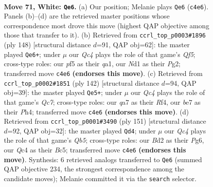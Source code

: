 \documentclass[11pt]{article}
\begin{document}
\clearpage

\begin{figure}[p]\centering
\begin{subfigure}{0.46\textwidth}\centering
\resizebox{\linewidth}{!}{%
\newchessgame
\chessboard[
  setfen={5r2/q3b1k1/5n2/P1p2p2/2Qp1Pp1/8/1R1BPK2/3N4 w - - 2 71},
  showmover=false,
  pgfstyle=straightmove, color=movearrow, markmove={c4-e6}
]}
\caption{}
\end{subfigure}\hfill
\begin{subfigure}{0.46\textwidth}\centering
\resizebox{\linewidth}{!}{%
\newchessgame
\chessboard[
  setfen={6k1/6b1/7p/1p2pQ1P/1r2P1p1/6B1/6PK/q7 w - - 14 75},
  showmover=false,
  pgfstyle=straightmove, color=movearrow, markmove={f5-e6}
]}
\caption{}
\end{subfigure}
\\[4pt]
\begin{subfigure}{0.46\textwidth}\centering
\resizebox{\linewidth}{!}{%
\newchessgame
\chessboard[
  setfen={6qk/2Q5/1p4pB/p1bb2Pp/P3pR1P/6K1/2p5/8 w - - 2 72},
  showmover=false,
  pgfstyle=straightmove, color=movearrow, markmove={c7-e5}
]}
\caption{}
\end{subfigure}\hfill
\begin{subfigure}{0.46\textwidth}\centering
\resizebox{\linewidth}{!}{%
\newchessgame
\chessboard[
  setfen={8/5pk1/6p1/2bPp3/1q6/1P4PP/4QP1K/3B4 b - - 2 76},
  showmover=false,
  pgfstyle=straightmove, color=movearrow, markmove={b4-d4}
]}
\caption{}
\end{subfigure}
\caption{\textbf{Move 71, White: \texttt{Qe6}.} (a) Our position; Melanie plays \texttt{Qe6} (\texttt{c4e6}). Panels (b)--(d) are the retrieved master positions whose correspondence most drove this move (highest QAP objective among those that transfer to it). (b) Retrieved from \texttt{ccrl\_top\_p0003\#1896} (ply 148) [structural distance $d$=91, QAP obj=62]: the master played \texttt{Qe6+}; under $\mu$ our \emph{Qc4} plays the role of that game's \emph{Qf5}; cross-type roles: our \emph{p}f5 as their \emph{q}a1, our \emph{N}d1 as their \emph{P}g2; transferred move \texttt{c4e6} \textbf{(endorses this move)}. (c) Retrieved from \texttt{ccrl\_top\_p0002\#1851} (ply 142) [structural distance $d$=94, QAP obj=39]: the master played \texttt{Qe5+}; under $\mu$ our \emph{Qc4} plays the role of that game's \emph{Qc7}; cross-type roles: our \emph{q}a7 as their \emph{R}f4, our \emph{b}e7 as their \emph{P}h4; transferred move \texttt{c4e6} \textbf{(endorses this move)}. (d) Retrieved from \texttt{ccrl\_top\_p0001\#3490} (ply 151) [structural distance $d$=92, QAP obj=32]: the master played \texttt{Qd4}; under $\mu$ our \emph{Qc4} plays the role of that game's \emph{Qb5}; cross-type roles: our \emph{B}d2 as their \emph{P}g6, our \emph{Q}c4 as their \emph{B}c5; transferred move \texttt{c4e6} \textbf{(endorses this move)}. Synthesis: 6 retrieved analogs transferred to \texttt{Qe6} (summed QAP objective 234, the strongest correspondence among the candidate moves); Melanie committed it via the \texttt{search} selector.}
\label{fig:thought-m140}
\end{figure}
\end{document}
